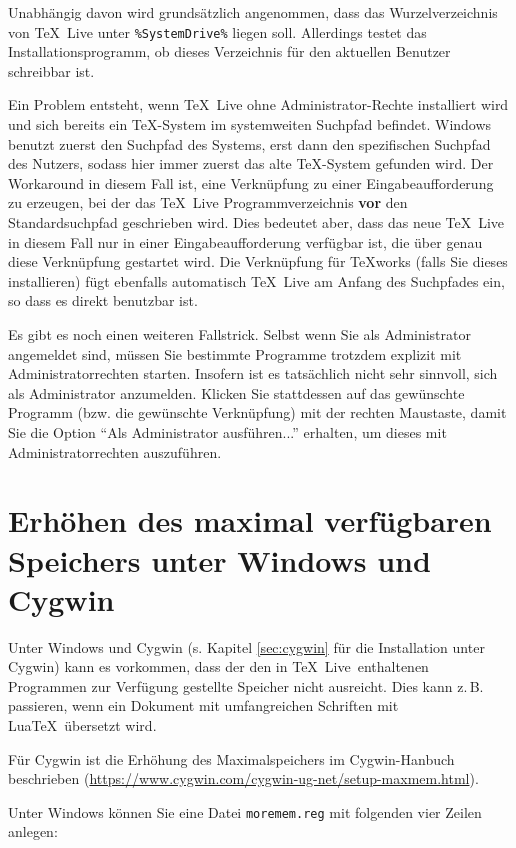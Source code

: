 \documentclass[12pt,ngerman,a4paper,fullparskip]{report}
\newcommand{\TL}{\TeX\ Live\xspace}
\newcommand{\code}[1]{\texttt{#1}}
\begin{document}
Unabhängig davon wird grundsätzlich angenommen, dass das Wurzelverzeichnis
von \TL unter \verb|%SystemDrive%| liegen soll. Allerdings testet das
Installationsprogramm, ob dieses Verzeichnis für den aktuellen Benutzer
schreibbar ist.

Ein Problem entsteht, wenn \TL ohne Administrator-Rechte installiert
wird und sich bereits ein \TeX{}-System im systemweiten Suchpfad
befindet. Windows benutzt zuerst den Suchpfad des Systems, erst dann
den spezifischen Suchpfad des Nutzers, sodass hier immer zuerst
das alte \TeX-System gefunden wird. Der Workaround in diesem Fall ist, eine Verknüpfung zu einer Eingabeaufforderung zu erzeugen, bei der das \TL Programmverzeichnis \textbf{vor} den Standard\-such\-pfad
geschrieben wird. Dies bedeutet aber, dass das neue \TL in diesem Fall nur in einer
Eingabeaufforderung verfügbar ist, die über genau diese Verknüpfung gestartet
wird. Die Verknüpfung für \TeX{}works (falls Sie dieses installieren)
fügt ebenfalls automatisch \TL{} am Anfang des Suchpfades ein, so dass
es direkt benutzbar ist.

Es gibt es noch einen weiteren Fallstrick. 
Selbst wenn Sie als Administrator angemeldet sind, müssen Sie bestimmte Programme trotzdem explizit
mit Administratorrechten starten. 
Insofern ist es tatsächlich nicht sehr sinnvoll, sich als Administrator anzumelden. 
Klicken Sie stattdessen auf das gewünschte Programm (bzw. die gewünschte Verknüpfung) mit der
rechten Maustaste, damit Sie die Option \enquote{Als Administrator ausführen...} erhalten, um dieses mit Administratorrechten auszuführen.

\section{Erhöhen des maximal verfügbaren Speichers unter Windows und Cygwin}
\label{sec:cygwin-maxmem}

Unter Windows und Cygwin (s. Kapitel \ref{sec:cygwin} für die Installation unter
Cygwin) kann es vorkommen, dass der den in \TL\ enthaltenen Programmen zur
Verfügung gestellte Speicher nicht ausreicht. Dies kann z.\,B. passieren, wenn 
ein Dokument mit umfangreichen Schriften mit Lua\TeX\ übersetzt wird.

Für Cygwin ist die Erhöhung des Maximalspeichers im Cygwin-Hanbuch beschrieben
(\url{https://www.cygwin.com/cygwin-ug-net/setup-maxmem.html}).

Unter Windows können Sie eine Datei \code{moremem.reg} mit folgenden vier
Zeilen anlegen:
\end{document}
